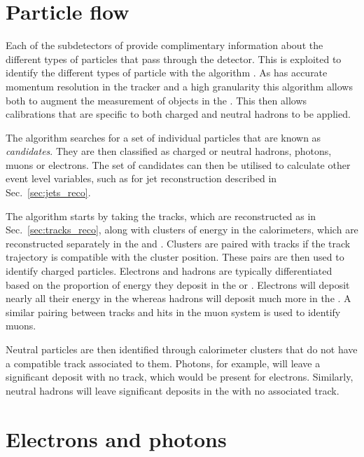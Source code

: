 \section{Particle flow}
\label{sec:pflow_reco}

Each of the subdetectors of \CMS provide complimentary information
about the different types of particles that pass through the detector.
This is exploited to identify the different types of particle with the
\PF algorithm
\cite{CMS-PAS-PFT-09-001,CMS-PAS-PFT-10-001,CMS-PAS-PFT-10-002}. As
\CMS has accurate momentum resolution in the tracker and a high
granularity \ECAL this algorithm allows both to augment the
measurement of objects in the \HCAL. This then allows calibrations
that are specific to both charged and neutral hadrons to be applied. 

The \PF algorithm searches for a set of individual particles that are
known as \PF \emph{candidates}. They are then classified as charged or
neutral hadrons, photons, muons or electrons. The set of \PF
candidates can then be utilised to calculate other event level
variables, such as for jet reconstruction described in
Sec.~\ref{sec:jets_reco}.

The algorithm starts by taking the tracks, which are reconstructed as
in Sec.~\ref{sec:tracks_reco}, along with clusters of energy
in the calorimeters, which are reconstructed separately in the \ECAL and
\HCAL. Clusters are paired with tracks if the track trajectory is
compatible with the cluster position. These pairs are then used to
identify charged particles. Electrons and hadrons are typically
differentiated based on the proportion of energy they deposit in the
\ECAL or \HCAL. Electrons will deposit nearly all their energy in the
\ECAL whereas hadrons will deposit much more in the \HCAL. A similar
pairing between tracks and hits in the muon system is used to identify
muons. 

Neutral particles are then identified through calorimeter clusters
that do not have a compatible track associated to them. Photons, for
example, will leave a significant \ECAL deposit with no track, which
would be present for electrons. Similarly, neutral hadrons will leave
significant deposits in the \HCAL with no associated track.

\section{Electrons and photons}
\label{sec:electrons_reco}

